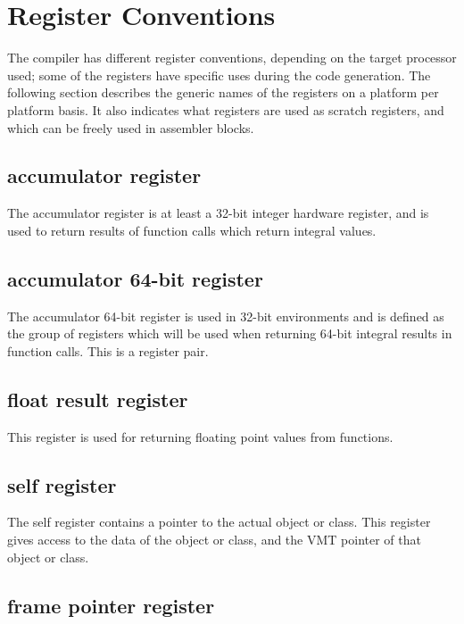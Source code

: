 \section{Register Conventions}
\label{se:RegConvs}

The compiler has different register conventions, depending on the
target processor used; some of the registers have specific uses
during the code generation. The following section describes the
generic names of the registers on a platform per platform basis. It
also indicates what registers are used as scratch registers, and
which can be freely used in assembler blocks.

\subsection{accumulator register}

The accumulator register is at least a 32-bit integer
hardware register, and is used to return results of
function calls which return integral values.

\subsection{accumulator 64-bit register}

The accumulator 64-bit register is used in 32-bit environments
and is defined as the group of registers which will be used when
returning 64-bit integral results in function calls. This is a
register pair.

\subsection{float result register}

This register is used for returning floating point values
from functions.

\subsection{self register}

The self register contains a pointer to the actual object or class.
This register gives access to the data of the object or class, and
the VMT pointer of that object or class.

\subsection{frame pointer register}

